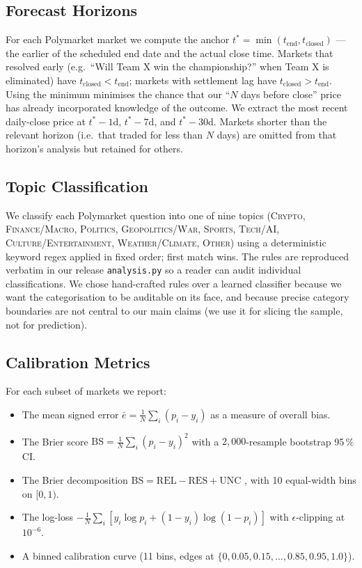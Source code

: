 \documentclass{article}
\begin{document}
\subsection{Forecast Horizons}

For each Polymarket market we compute the anchor
$t^* = \min(t_{\text{end}}, t_{\text{closed}})$ --- the earlier of the
scheduled end date and the actual close time. Markets that resolved
early (e.g.\ ``Will Team X win the championship?'' when Team X is
eliminated) have $t_{\text{closed}} < t_{\text{end}}$; markets with
settlement lag have $t_{\text{closed}} > t_{\text{end}}$. Using the
minimum minimises the chance that our ``$N$ days before close'' price
has already incorporated knowledge of the outcome. We extract the most
recent daily-close price at $t^*-1$d, $t^*-7$d, and $t^*-30$d. Markets
shorter than the relevant horizon (i.e.\ that traded for less than $N$
days) are omitted from that horizon's analysis but retained for others.

\subsection{Topic Classification}

We classify each Polymarket question into one of nine topics
(\textsc{Crypto}, \textsc{Finance/Macro}, \textsc{Politics},
\textsc{Geopolitics/War}, \textsc{Sports}, \textsc{Tech/AI},
\textsc{Culture/Entertainment}, \textsc{Weather/Climate},
\textsc{Other}) using a deterministic keyword regex applied in fixed
order; first match wins. The rules are reproduced verbatim in our
release \texttt{analysis.py} so a reader can audit individual
classifications. We chose hand-crafted rules over a learned classifier
because we want the categorisation to be auditable on its face, and
because precise category boundaries are not central to our main claims
(we use it for slicing the sample, not for prediction).

\subsection{Calibration Metrics}

For each subset of markets we report:
\begin{itemize}
  \item The mean signed error
    $\bar{e} = \frac{1}{N}\sum_i (p_i - y_i)$ as a measure of overall
    bias.
  \item The Brier score $\text{BS} = \frac{1}{N}\sum_i (p_i - y_i)^2$
    with a $2{,}000$-resample bootstrap 95\,\% CI.
  \item The Brier decomposition
    $\text{BS} = \text{REL} - \text{RES} + \text{UNC}$
    \citep{murphy1973vector}, with 10 equal-width bins on $[0,1)$.
  \item The log-loss
    $-\frac{1}{N}\sum_i [y_i\log p_i + (1-y_i)\log(1-p_i)]$
    with $\epsilon$-clipping at $10^{-6}$.
  \item A binned calibration curve (11 bins, edges at
    $\{0, 0.05, 0.15, \dots, 0.85, 0.95, 1.0\}$).
\end{itemize}
\end{document}
